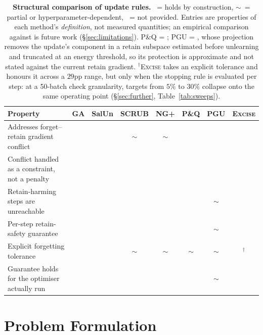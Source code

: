 \documentclass{article}
\newcommand{\ours}{\textsc{Excise}}
\newcommand{\cmark}{{\color{green!60!black}\ding{51}}}
\newcommand{\xmark}{{\color{red!70!black}\ding{55}}}
\newcommand{\pmark}{{\color{orange!80!black}$\sim$}}
\newcommand{\rev}[1]{{\color{revisedB}#1}}
\theoremstyle{remark}
\theoremstyle{plain}
\begin{document}
\begin{table}[t]
\centering
\caption{\textbf{Structural comparison of update rules.} \cmark~= holds by
construction, \pmark~= partial or hyperparameter-dependent, \xmark~= not
provided. Entries are properties of each method's \emph{definition}, not
measured quantities; an empirical comparison against
\citet{patel2025learning} is future work (\S\ref{sec:limitations}).
P\&Q = \citet{patel2025learning}; \rev{PGU = \citet{hoang2024learn}, whose
projection removes the update's component in a retain subspace estimated before
unlearning and truncated at an energy threshold, so its protection is
approximate and not stated against the current retain gradient.}
$^\dagger$\ours{} takes an explicit tolerance and honours it across a $29$pp
range, but only when the stopping rule is evaluated per step: at a 50-batch
check granularity, targets from $5\%$ to $30\%$ collapse onto the same operating
point (\S\ref{sec:further}, Table~\ref{tab:sweeps}).}
\label{tab:properties}
\small
\begin{tabular}{@{}lccccccc@{}}
\toprule
\textbf{Property} & \textbf{GA} & \textbf{SalUn} & \textbf{SCRUB} &
\textbf{NG+} & \textbf{P\&Q} & \rev{\textbf{PGU}} & \textbf{\ours{}} \\
\midrule
Addresses forget--retain gradient conflict & \xmark & \xmark & \pmark & \pmark & \cmark & \cmark & \cmark \\
Conflict handled as a constraint, not a penalty & \xmark & \xmark & \xmark & \xmark & \xmark & \cmark & \cmark \\
Retain-harming steps are unreachable & \xmark & \xmark & \xmark & \xmark & \xmark & \pmark & \cmark \\
Per-step retain-safety guarantee & \xmark & \xmark & \xmark & \xmark & \xmark & \pmark & \cmark \\
Explicit forgetting tolerance & \xmark & \xmark & \pmark & \pmark & \pmark & \pmark & \cmark$^\dagger$ \\
Guarantee holds for the optimiser actually run & \xmark & \xmark & \xmark & \xmark & \xmark & \pmark & \cmark \\
\bottomrule
\end{tabular}
\end{table}

\section{Problem Formulation}\label{sec:problem}
\end{document}
